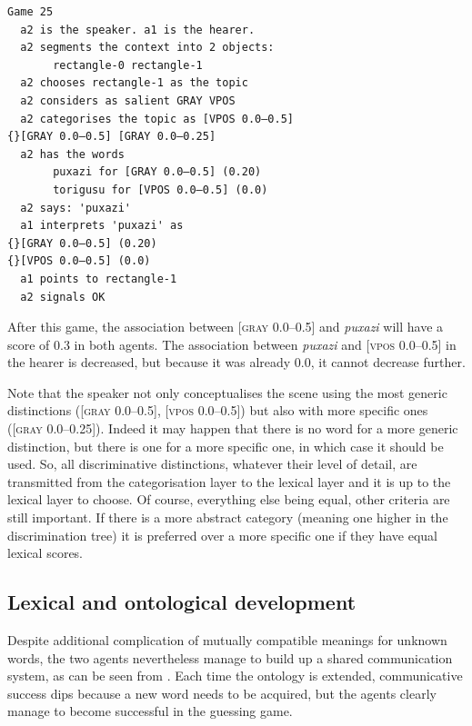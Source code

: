 \begin{verbatim}
Game 25
  a2 is the speaker. a1 is the hearer. 
  a2 segments the context into 2 objects: 
       rectangle-0 rectangle-1 
  a2 chooses rectangle-1 as the topic 
  a2 considers as salient GRAY VPOS
  a2 categorises the topic as [VPOS 0.0–0.5] 
{}[GRAY 0.0–0.5] [GRAY 0.0–0.25]
  a2 has the words
       puxazi for [GRAY 0.0–0.5] (0.20)
       torigusu for [VPOS 0.0–0.5] (0.0)
  a2 says: 'puxazi'
  a1 interprets 'puxazi' as
{}[GRAY 0.0–0.5] (0.20)
{}[VPOS 0.0–0.5] (0.0)
  a1 points to rectangle-1
  a2 signals OK
\end{verbatim}
After this game, the association between [\textsc{gray} 0.0–0.5] 
and \textit{puxazi} will have a score of 0.3 in both agents. 
The association between \textit{puxazi} and [\textsc{vpos} 0.0–0.5] 
in the hearer is decreased, but because it was already 
0.0, it cannot decrease further. 

Note that the speaker not only conceptualises the scene using 
the most generic distinctions ([\textsc{gray} 0.0–0.5], 
{}[\textsc{vpos} 0.0–0.5]) but also
with more specific ones ([\textsc{gray} 0.0–0.25]). Indeed it 
may happen that there is no word for a more generic 
distinction, but there is one for a more specific 
one, in which case it should be used. 
So, all discriminative distinctions, 
whatever their level of detail, are
transmitted from the categorisation layer to the 
lexical layer and it is up to the lexical layer
to choose. Of course, everything else being equal, 
other criteria are still important. If there is a 
more abstract category (meaning one higher in the 
discrimination tree) it is preferred over a more 
specific one if they have equal lexical scores. 

\subsection{Lexical and ontological development} 

Despite additional complication of mutually 
compatible meanings for unknown words, the two agents
nevertheless manage to 
build up a shared communication system, as can be seen 
from . Each time the ontology is 
extended, communicative success dips because a new 
word needs to be acquired, but the agents clearly 
manage to become successful in the guessing game. 



